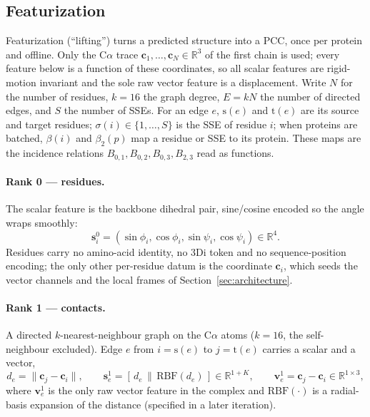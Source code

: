 \documentclass[11pt,a4paper]{article}
\theoremstyle{definition}
\begin{document}
\subsection{Featurization}
\label{sec:featurization}
\label{sec:lifting}

Featurization (``lifting'') turns a predicted structure into a PCC, once per
protein and offline. Only the C$\alpha$ trace $\mathbf{c}_1,\dots,\mathbf{c}_N\in
\mathbb{R}^{3}$ of the first chain is used; every feature below is a function of
these coordinates, so all scalar features are rigid-motion invariant and the sole
raw vector feature is a displacement. Write $N$ for the number of residues, $k=16$
the graph degree, $E=kN$ the number of directed edges, and $S$ the number of SSEs.
For an edge $e$, $\mathrm{s}(e)$ and $\mathrm{t}(e)$ are its source and target
residues; $\sigma(i)\in\{1,\dots,S\}$ is the SSE of residue $i$; when proteins are
batched, $\beta(i)$ and $\beta_2(p)$ map a residue or SSE to its protein. These
maps are the incidence relations $B_{0,1},B_{0,2},B_{0,3},B_{2,3}$ read as
functions.

\paragraph{Rank 0 --- residues.} The scalar feature is the backbone dihedral pair,
sine/cosine encoded so the angle wraps smoothly:
\[
\mathbf{s}^{0}_i=(\sin\phi_i,\cos\phi_i,\sin\psi_i,\cos\psi_i)\in\mathbb{R}^{4}.
\]
Residues carry no amino-acid identity, no 3Di token and no sequence-position
encoding; the only other per-residue datum is the coordinate $\mathbf{c}_i$, which
seeds the vector channels and the local frames of Section~\ref{sec:architecture}.

\paragraph{Rank 1 --- contacts.} A directed $k$-nearest-neighbour graph on the
C$\alpha$ atoms ($k=16$, the self-neighbour excluded). Edge $e$ from $i=\mathrm{s}(e)$
to $j=\mathrm{t}(e)$ carries a scalar and a vector,
\[
d_e=\lVert\mathbf{c}_j-\mathbf{c}_i\rVert,\qquad
\mathbf{s}^{1}_e=[\,d_e\,\|\,\mathrm{RBF}(d_e)\,]\in\mathbb{R}^{1+K},\qquad
\mathbf{v}^{1}_e=\mathbf{c}_j-\mathbf{c}_i\in\mathbb{R}^{1\times 3},
\]
where $\mathbf{v}^{1}_e$ is the only raw vector feature in the complex and
$\mathrm{RBF}(\cdot)$ is a radial-basis expansion of the distance (specified in a
later iteration).
\end{document}
